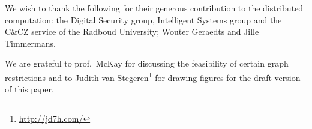 \documentclass{report}
\begin{document}
\begin{acknowledgment}
We wish to thank the following for their generous contribution to the
distributed computation:
    the Digital Security group, Intelligent Systems group
    and the C\&CZ service of the Radboud University;
    Wouter Geraedts and
    Jille Timmermans.

We are grateful to prof.~McKay for discussing
the feasibility of certain graph restrictions and
to Judith van Stegeren\footnote{\url{http://jd7h.com/}}
for drawing figures for the draft version of this paper.
\end{acknowledgment}

\clearpage
{}

\end{document}
